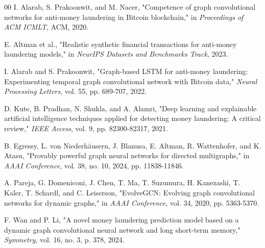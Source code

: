 \documentclass[conference]{IEEEtran}
\begin{document}
\begin{thebibliography}{00}
 I. Alarab, S. Prakoonwit, and M. Nacer, "Competence of graph convolutional networks for anti-money laundering in Bitcoin blockchain," in \textit{Proceedings of ACM ICMLT}, ACM, 2020.

 E. Altman et al., "Realistic synthetic financial transactions for anti-money laundering models," in \textit{NeurIPS Datasets and Benchmarks Track}, 2023.

 I. Alarab and S. Prakoonwit, "Graph-based LSTM for anti-money laundering: Experimenting temporal graph convolutional network with Bitcoin data," \textit{Neural Processing Letters}, vol. 55, pp. 689-707, 2022.

 D. Kute, B. Pradhan, N. Shukla, and A. Alamri, "Deep learning and explainable artificial intelligence techniques applied for detecting money laundering: A critical review," \textit{IEEE Access}, vol. 9, pp. 82300-82317, 2021.

 B. Egressy, L. von Niederhäusern, J. Blanusa, E. Altman, R. Wattenhofer, and K. Atasu, "Provably powerful graph neural networks for directed multigraphs," in \textit{AAAI Conference}, vol. 38, no. 10, 2024, pp. 11838-11846.

 A. Pareja, G. Domeniconi, J. Chen, T. Ma, T. Suzumura, H. Kanezashi, T. Kaler, T. Schardl, and C. Leiserson, "EvolveGCN: Evolving graph convolutional networks for dynamic graphs," in \textit{AAAI Conference}, vol. 34, 2020, pp. 5363-5370.

 F. Wan and P. Li, "A novel money laundering prediction model based on a dynamic graph convolutional neural network and long short-term memory," \textit{Symmetry}, vol. 16, no. 3, p. 378, 2024.

\end{thebibliography}
\end{document}
